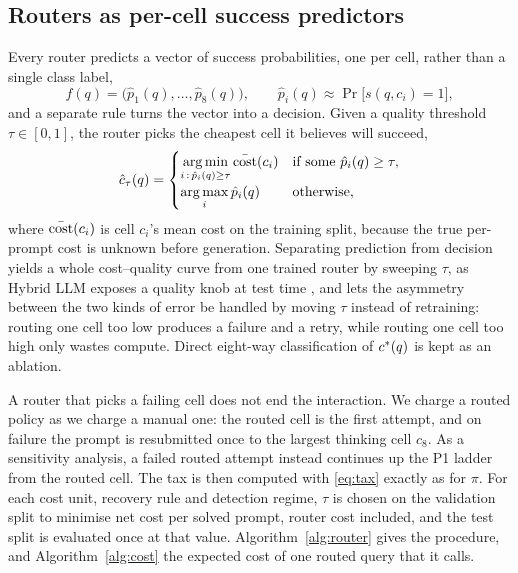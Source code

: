 \subsection{Routers as per-cell success predictors}
\label{sec:routers}

Every router predicts a vector of success probabilities, one per cell, rather
than a single class label,
\begin{equation}
  f(q) = \bigl(\hat{p}_1(q), \dots, \hat{p}_8(q)\bigr), \qquad
  \hat{p}_i(q) \approx \Pr\bigl[s(q, c_i) = 1\bigr],
  \label{eq:router}
\end{equation}
and a separate rule turns the vector into a decision. Given a quality
threshold $\tau \in [0, 1]$, the router picks the cheapest cell it believes
will succeed,
\begin{equation}
  \hat{c}_\tau(q) =
  \begin{cases}
    \displaystyle\operatorname*{arg\,min}_{i \,:\, \hat{p}_i(q) \geq \tau} \bar{\mathrm{cost}}(c_i)
      & \text{if some } \hat{p}_i(q) \geq \tau,\\[1.2ex]
    \displaystyle\operatorname*{arg\,max}_{i} \hat{p}_i(q) & \text{otherwise},
  \end{cases}
  \label{eq:selection}
\end{equation}
where $\bar{\mathrm{cost}}(c_i)$ is cell $c_i$'s mean cost on the training split,
because the true per-prompt cost is unknown before generation. Separating
prediction from decision yields a whole cost--quality curve from one trained
router by sweeping $\tau$, as Hybrid LLM exposes a quality knob at test time
\cite{ding2024hybridllm}, and lets the asymmetry between the two kinds of
error be handled by moving $\tau$ instead of retraining: routing one cell too
low produces a failure and a retry, while routing one cell too high only
wastes compute. Direct eight-way classification of $c^{*}(q)$ is kept as an
ablation.

A router that picks a failing cell does not end the interaction. We charge a
routed policy as we charge a manual one: the routed cell is the first
attempt, and on failure the prompt is resubmitted once to the largest
thinking cell $c_8$. As a sensitivity analysis, a failed routed attempt
instead continues up the P1 ladder from the routed cell. The tax is then
computed with \eqref{eq:tax} exactly as for $\pi$. For each cost unit,
recovery rule and detection regime, $\tau$ is chosen on the validation split
to minimise net cost per solved prompt, router cost included, and the test
split is evaluated once at that value. Algorithm~\ref{alg:router} gives the
procedure, and Algorithm~\ref{alg:cost} the expected cost of one routed query
that it calls.

